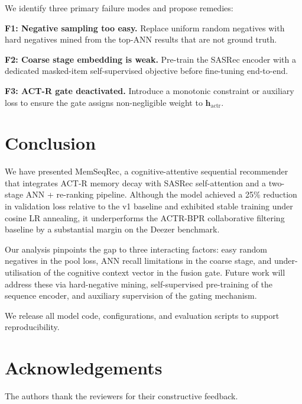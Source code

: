 \documentclass[conference]{IEEEtran}
\begin{document}
We identify three primary failure modes and propose remedies:

\textbf{F1: Negative sampling too easy.}
Replace uniform random negatives with hard negatives mined from
the top-ANN results that are not ground truth.

\textbf{F2: Coarse stage embedding is weak.}
Pre-train the SASRec encoder with a dedicated masked-item
self-supervised objective before fine-tuning end-to-end.

\textbf{F3: ACT-R gate deactivated.}
Introduce a monotonic constraint or auxiliary loss to ensure the
gate assigns non-negligible weight to $\mathbf{h}_{\text{actr}}$.

\section{Conclusion}

We have presented MemSeqRec, a cognitive-attentive sequential
recommender that integrates ACT-R memory decay with SASRec
self-attention and a two-stage ANN + re-ranking pipeline.
Although the model achieved a 25\% reduction in validation loss
relative to the v1 baseline and exhibited stable training under
cosine LR annealing, it underperforms the ACTR-BPR collaborative
filtering baseline by a substantial margin on the Deezer
benchmark.

Our analysis pinpoints the gap to three interacting factors:
easy random negatives in the pool loss, ANN recall limitations
in the coarse stage, and under-utilisation of the cognitive
context vector in the fusion gate.
Future work will address these via hard-negative mining,
self-supervised pre-training of the sequence encoder, and
auxiliary supervision of the gating mechanism.

We release all model code, configurations, and evaluation
scripts to support reproducibility.

\section*{Acknowledgements}
The authors thank the reviewers for their constructive feedback.
\end{document}
